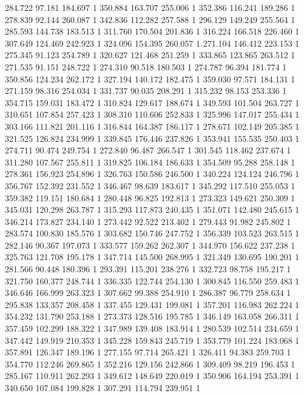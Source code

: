 	284.722	97.181	184.697	1
	350.884	163.707	255.006	1
	352.386	116.241	189.286	1
	278.839	92.144	260.087	1
	342.836	112.282	257.588	1
	296.129	149.249	255.564	1
	285.593	144.738	183.513	1
	311.760	170.504	201.836	1
	316.224	166.518	226.460	1
	307.649	124.469	242.923	1
	324.096	154.395	260.057	1
	271.104	146.412	223.153	1
	275.345	91.123	254.789	1
	320.627	121.468	251.259	1
	333.865	123.865	263.512	1
	271.535	91.151	248.722	1
	274.310	90.518	180.503	1
	274.787	96.394	181.774	1
	350.856	124.234	262.172	1
	327.194	140.172	182.475	1
	359.030	97.571	184.131	1
	271.159	98.316	254.034	1
	331.737	90.035	208.291	1
	315.232	98.153	253.336	1
	354.715	159.031	183.472	1
	310.824	129.617	188.674	1
	349.593	101.504	263.727	1
	310.651	107.854	257.423	1
	308.310	110.606	252.833	1
	325.996	147.017	255.434	1
	303.166	111.821	201.116	1
	316.844	164.387	186.117	1
	278.671	102.149	205.385	1
	321.525	126.824	234.999	1
	339.845	176.446	237.826	1
	353.941	155.535	250.403	1
	274.711	90.474	249.754	1
	272.840	96.487	266.547	1
	301.545	118.462	237.674	1
	311.280	107.567	255.811	1
	319.825	106.184	186.633	1
	354.509	95.288	258.148	1
	278.361	156.923	254.896	1
	326.763	150.586	246.500	1
	340.224	124.124	246.796	1
	356.767	152.392	231.552	1
	346.467	98.639	183.617	1
	345.292	117.510	255.053	1
	359.382	119.151	180.684	1
	280.448	96.825	192.813	1
	273.323	149.621	250.309	1
	345.031	120.298	263.787	1
	315.293	117.873	240.435	1
	351.071	142.480	245.615	1
	346.214	173.827	234.140	1
	273.442	92.522	213.402	1
	279.443	91.982	245.802	1
	283.574	100.830	185.576	1
	303.682	150.746	247.752	1
	356.339	103.523	263.515	1
	282.146	90.367	197.073	1
	333.577	159.262	262.307	1
	344.970	156.622	237.238	1
	325.763	121.708	195.178	1
	347.714	145.500	268.995	1
	321.349	130.695	190.201	1
	281.566	90.448	180.396	1
	293.391	115.201	238.276	1
	332.723	98.758	195.217	1
	321.750	160.377	248.744	1
	336.335	122.744	254.130	1
	300.845	116.550	259.483	1
	346.646	166.999	263.323	1
	307.662	99.388	254.910	1
	286.387	96.779	258.634	1
	295.838	133.357	208.458	1
	337.455	129.431	199.081	1
	357.201	116.983	262.224	1
	354.232	131.790	253.188	1
	273.373	128.516	195.785	1
	346.149	163.058	266.311	1
	357.459	102.299	188.322	1
	347.989	139.408	183.914	1
	280.539	102.514	234.659	1
	347.442	149.919	210.353	1
	345.228	159.843	245.719	1
	353.779	101.224	183.068	1
	357.891	126.347	189.196	1
	277.155	97.714	265.421	1
	326.411	94.383	259.703	1
	354.770	112.246	269.865	1
	352.216	129.156	242.866	1
	309.409	98.219	196.453	1
	285.167	110.911	262.293	1
	349.612	148.649	220.019	1
	350.906	164.194	253.391	1
	340.650	107.084	199.828	1
	307.291	114.794	239.951	1
